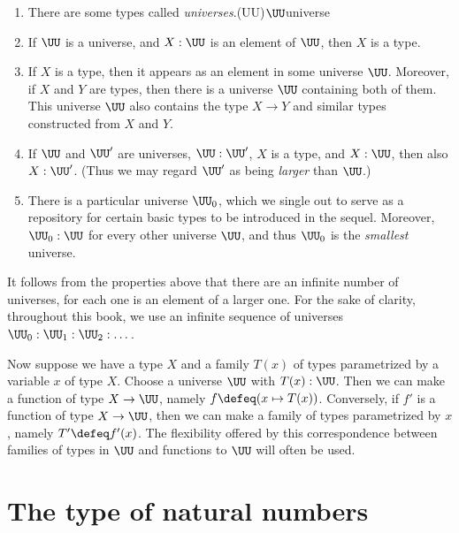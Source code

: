 \begin{enumerate}
  \item There are some types called \emph{universes}.\glossary(UU){$\protect\UU$}{universe}
  \item If $\UU$ is a universe, and $X : \UU$ is an element of $\UU$, then $X$ is a type.
  \item If $X$ is a type, then it appears as an element in some
  universe $\UU$. Moreover, if $X$ and $Y$ are types,
  then there is a universe $\UU$ containing both of them.
  This universe $\UU$ also contains the type $X\to Y$ and similar
  types constructed from $X$ and $Y$.
  \item\label{it:cumulative} If $\UU$ and $\UU'$ are universes,
  $\UU:\UU'$, $X$ is a type, and $X:\UU$, then also $X:\UU'$.
  (Thus we may regard $\UU'$ as being \emph{larger} than $\UU$.)
  \item There is a particular universe $\UU_0$, which we single out to serve
  as a repository for certain basic types to be introduced in the sequel.
  Moreover, $\UU_0 : \UU$ for every other universe $\UU$,
  and thus $\UU_0$ is the \emph{smallest} universe.
\end{enumerate}

It follows from the properties above that there are an infinite number of
 universes, for each one is an element of a larger one. For the sake of
 clarity, throughout this book, we use an infinite sequence of universes
 $\UU_0 : \UU_1 : \UU_2 : \dots$.

Now suppose we have a type $X$ and a family $T(x)$ of types parametrized by a variable $x$ of type $X$.  Choose a universe $\UU$ with $T(x) : \UU$.
Then we can make a function of type $X \to \UU$, namely $f \defeq (x \mapsto T(x))$.  Conversely, if $f'$ is a function of type $X \to \UU$, then
we can make a family of types parametrized by $x$, namely $T' \defeq f'(x)$.  The flexibility offered by this correspondence between families of
types in $\UU$ and functions to $\UU$ will often be used.

\section{The type of natural numbers}
\label{sec:natural-numbers}

